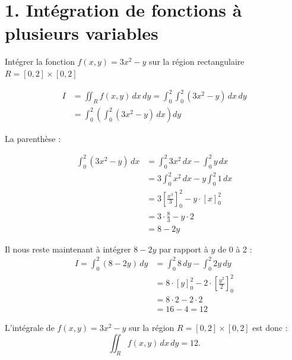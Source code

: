 
\section*{1. Intégration de fonctions à plusieurs variables}

\begin{solution}
    Intégrer la fonction $f(x,y)=3x^2-y$ sur la région rectangulaire $R=[0,2]\times[0,2]$
    
    \[
    \begin{aligned}
    I &= \iint_R f(x, y) \, dx \, dy = \int_0^2 \int_0^2 (3x^2 - y) \, dx \, dy \\
    &= \int_0^2 \left( \int_0^2 (3x^2 - y) \, dx \right) dy
    \end{aligned}
    \]

    La parenthèse : 

    \[
    \begin{aligned}
        \int_0^2 (3x^2 - y) \, dx &= \int_0^2 3x^2 \, dx - \int_0^2 y \, dx \\
        &= 3 \int_0^2 x^2 \, dx - y \int_0^2 1 \, dx \\
        &= 3 \left[ \frac{x^3}{3} \right]_0^2 - y \cdot \left[ x \right]_0^2 \\
        &= 3 \cdot \frac{8}{3} - y \cdot 2 \\
        &= 8 - 2y
    \end{aligned}
    \]

    Il nous reste maintenant à intégrer \( 8 - 2y \) par rapport à \( y \) de 0 à 2 :
    \[
    \begin{aligned}
        I = \int_0^2 (8 - 2y) \, dy &= \int_0^2 8 \, dy - \int_0^2 2y \, dy \\
        &= 8 \cdot \left[ y \right]_0^2 - 2 \cdot \left[ \frac{y^2}{2} \right]_0^2 \\
        &= 8 \cdot 2 - 2 \cdot 2 \\
        &= 16 - 4 = 12
    \end{aligned}
    \]

    L'intégrale de \( f(x, y) = 3x^2 - y \) sur la région \( R = [0, 2] \times [0, 2] \) est donc :
    \[
    \iint_R f(x, y) \, dx \, dy = 12.
    \]

\end{solution}

